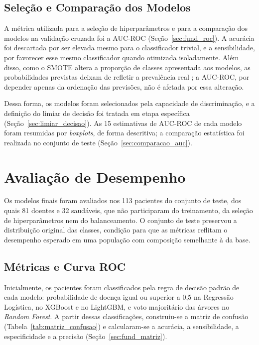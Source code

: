 \subsection{Seleção e Comparação dos Modelos}
\label{sec:metrica_selecao}
\label{sec:comparacao_cv}

A métrica utilizada para a seleção de hiperparâmetros e para a comparação dos modelos na validação cruzada foi a AUC-ROC (Seção~\ref{sec:fund_roc}). A acurácia foi descartada por ser elevada mesmo para o classificador trivial, e a sensibilidade, por favorecer esse mesmo classificador quando otimizada isoladamente. Além disso, como o SMOTE altera a proporção de classes apresentada aos modelos, as probabilidades previstas deixam de refletir a prevalência real \cite{vandenGoorbergh2022Harm}; a AUC-ROC, por depender apenas da ordenação das previsões, não é afetada por essa alteração.

Dessa forma, os modelos foram selecionados pela capacidade de discriminação, e a definição do limiar de decisão foi tratada em etapa específica (Seção~\ref{sec:limiar_decisao}). As 15 estimativas de AUC-ROC de cada modelo foram resumidas por \textit{boxplots}, de forma descritiva; a comparação estatística foi realizada no conjunto de teste (Seção~\ref{sec:comparacao_auc}).

\section{Avaliação de Desempenho}
\label{sec:avaliacao_desempenho}

Os modelos finais foram avaliados nos 113 pacientes do conjunto de teste, dos quais 81 doentes e 32 saudáveis, que não participaram do treinamento, da seleção de hiperparâmetros nem do balanceamento. O conjunto de teste preservou a distribuição original das classes, condição para que as métricas reflitam o desempenho esperado em uma população com composição semelhante à da base.

\subsection{Métricas e Curva ROC}
\label{sec:metricas}

Inicialmente, os pacientes foram classificados pela regra de decisão padrão de cada modelo: probabilidade de doença igual ou superior a 0,5 na Regressão Logística, no XGBoost e no LightGBM, e voto majoritário das árvores no \textit{Random Forest}. A partir dessas classificações, construiu-se a matriz de confusão (Tabela~\ref{tab:matriz_confusao}) e calcularam-se a acurácia, a sensibilidade, a especificidade e a precisão (Seção~\ref{sec:fund_matriz}).

